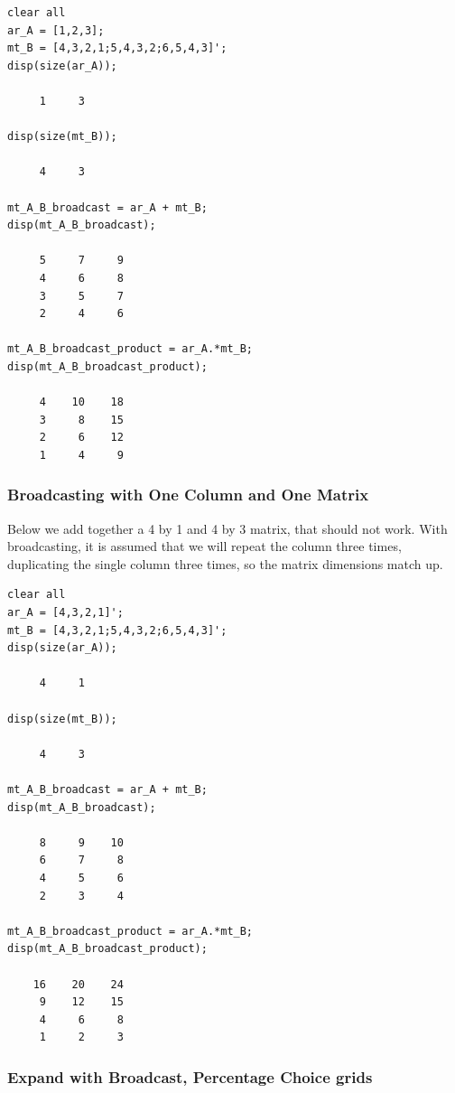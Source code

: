 \documentclass[
]{book}
\begin{document}
\begin{verbatim}
clear all
ar_A = [1,2,3];
mt_B = [4,3,2,1;5,4,3,2;6,5,4,3]';
disp(size(ar_A));

     1     3

disp(size(mt_B));

     4     3

mt_A_B_broadcast = ar_A + mt_B;
disp(mt_A_B_broadcast);

     5     7     9
     4     6     8
     3     5     7
     2     4     6

mt_A_B_broadcast_product = ar_A.*mt_B;
disp(mt_A_B_broadcast_product);

     4    10    18
     3     8    15
     2     6    12
     1     4     9
\end{verbatim}

\hypertarget{broadcasting-with-one-column-and-one-matrix}{%
\subsubsection{Broadcasting with One Column and One Matrix}\label{broadcasting-with-one-column-and-one-matrix}}

Below we add together a 4 by 1 and 4 by 3 matrix, that should not work.
With broadcasting, it is assumed that we will repeat the column three
times, duplicating the single column three times, so the matrix
dimensions match up.

\begin{verbatim}
clear all
ar_A = [4,3,2,1]';
mt_B = [4,3,2,1;5,4,3,2;6,5,4,3]';
disp(size(ar_A));

     4     1

disp(size(mt_B));

     4     3

mt_A_B_broadcast = ar_A + mt_B;
disp(mt_A_B_broadcast);

     8     9    10
     6     7     8
     4     5     6
     2     3     4

mt_A_B_broadcast_product = ar_A.*mt_B;
disp(mt_A_B_broadcast_product);

    16    20    24
     9    12    15
     4     6     8
     1     2     3
\end{verbatim}

\hypertarget{expand-with-broadcast-percentage-choice-grids}{%
\subsubsection{Expand with Broadcast, Percentage Choice grids}\label{expand-with-broadcast-percentage-choice-grids}}
\end{document}
